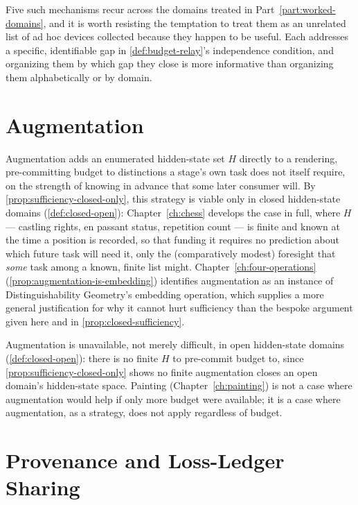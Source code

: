 Five such mechanisms recur across the domains treated in
Part~\ref{part:worked-domains}, and it is worth resisting the temptation
to treat them as an unrelated list of ad hoc devices collected because
they happen to be useful. Each addresses a specific, identifiable gap in
\cref{def:budget-relay}'s independence condition, and organizing them by
which gap they close is more informative than organizing them
alphabetically or by domain.

\section{Augmentation}
\label{sec:coord-augmentation}

Augmentation adds an enumerated hidden-state set $H$ directly to a
rendering, pre-committing budget to distinctions a stage's own task does
not itself require, on the strength of knowing in advance that some later
consumer will. By \cref{prop:sufficiency-closed-only}, this strategy is
viable only in closed hidden-state domains (\cref{def:closed-open}):
Chapter~\ref{ch:chess} develops the case in full, where $H$ --- castling
rights, en passant status, repetition count --- is finite and known at
the time a position is recorded, so that funding it requires no
prediction about which future task will need it, only the (comparatively
modest) foresight that \emph{some} task among a known, finite list might.
Chapter~\ref{ch:four-operations} (\cref{prop:augmentation-is-embedding})
identifies augmentation as an instance of Distinguishability Geometry's
embedding operation, which supplies a more general justification for why it
cannot hurt sufficiency than the bespoke argument given here and in
\cref{prop:closed-sufficiency}.

\begin{remark}
\label{rem:augmentation-limit}
Augmentation is unavailable, not merely difficult, in open hidden-state
domains (\cref{def:closed-open}): there is no finite $H$ to pre-commit
budget to, since \cref{prop:sufficiency-closed-only} shows no finite
augmentation closes an open domain's hidden-state space. Painting
(Chapter~\ref{ch:painting}) is not a case where augmentation would help
if only more budget were available; it is a case where augmentation, as a
strategy, does not apply regardless of budget.
\end{remark}

\section{Provenance and Loss-Ledger Sharing}
\label{sec:coord-provenance}

